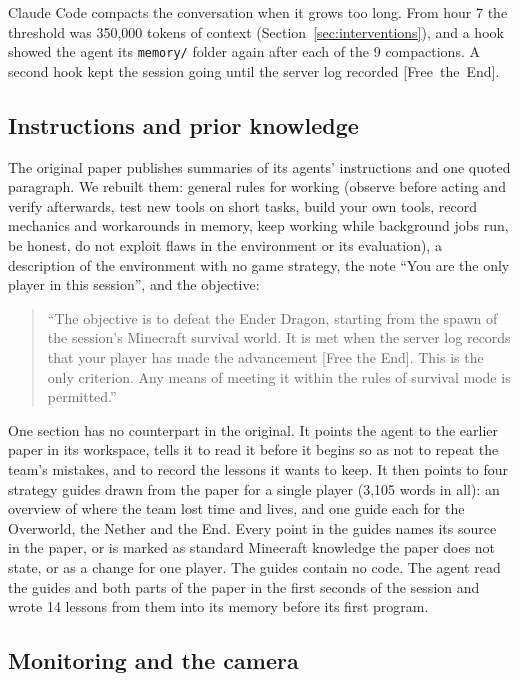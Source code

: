 \documentclass[11pt,a4paper]{article}
\newcommand{\adv}[1]{\mbox{\textsf{[#1]}}}
\begin{document}
Claude Code compacts the conversation when it grows too long. From hour 7 the threshold was 350,000 tokens of context (Section~\ref{sec:interventions}), and a hook showed the agent its \texttt{memory/} folder again after each of the 9 compactions. A second hook kept the session going until the server log recorded \adv{Free the End}.

\subsection{Instructions and prior knowledge}

The original paper publishes summaries of its agents' instructions and one quoted paragraph. We rebuilt them: general rules for working (observe before acting and verify afterwards, test new tools on short tasks, build your own tools, record mechanics and workarounds in memory, keep working while background jobs run, be honest, do not exploit flaws in the environment or its evaluation), a description of the environment with no game strategy, the note ``You are the only player in this session'', and the objective:

\begin{quote}
``The objective is to defeat the Ender Dragon, starting from the spawn of the session's Minecraft survival world. It is met when the server log records that your player has made the advancement [Free the End]. This is the only criterion. Any means of meeting it within the rules of survival mode is permitted.''
\end{quote}

One section has no counterpart in the original. It points the agent to the earlier paper in its workspace, tells it to read it before it begins so as not to repeat the team's mistakes, and to record the lessons it wants to keep. It then points to four strategy guides drawn from the paper for a single player (3,105 words in all): an overview of where the team lost time and lives, and one guide each for the Overworld, the Nether and the End. Every point in the guides names its source in the paper, or is marked as standard Minecraft knowledge the paper does not state, or as a change for one player. The guides contain no code. The agent read the guides and both parts of the paper in the first seconds of the session and wrote 14 lessons from them into its memory before its first program.

\subsection{Monitoring and the camera}
\end{document}
